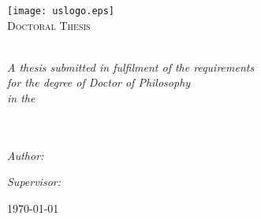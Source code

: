 \pagestyle{empty}
	\begin{center}

		\texttt{[image: uslogo.eps]}\\[2cm]%
		\textsc{\Large Doctoral Thesis}

		\Huge \textbf{\myTitle}\\[3cm] %

		\large \textit{A thesis submitted in fulfilment of the requirements\\ for the degree of Doctor of Philosophy}\\[0.5cm] %
		\textit{in the}\\[0.5cm]
		\myDepartment\\ \myFaculty\\[1cm]
	
		\begin{minipage}{.45\linewidth}
			\begin{flushleft} %
			\emph{Author:}\\
			\href{ http://www.sussex.ac.uk/profiles/357982 }{\myName} %
			\end{flushleft}
		\end{minipage}
		\hfill
		\begin{minipage}{.45\linewidth}
			\begin{flushright} %
			\emph{Supervisor:} \\
			\mySupervisor %
			\end{flushright}
		\end{minipage}

		\vfill
		\large \today
		 
	\end{center}
